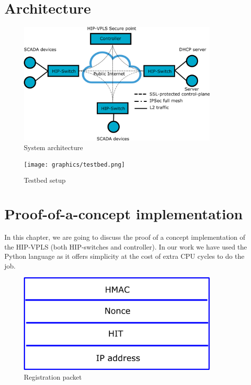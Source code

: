 \chapter{Architecture}

\begin{figure}[h!]
\centering
\includegraphics[width=0.9\textwidth]{graphics/arch.png}
\caption{System architecture}
\label{fig:architecture}
\end{figure}       


\begin{figure}[h!]
\centering
\texttt{[image: graphics/testbed.png]}
\caption{Testbed setup}
\label{fig:testbed}
\end{figure}    
    
\chapter{Proof-of-a-concept implementation}
In this chapter, we are going to discuss the proof of a concept
implementation of the HIP-VPLS (both HIP-switches and controller). 
In our work we have used the Python language as it offers simplicity
at the cost of extra CPU cycles to do the job.


\begin{figure}[h!]
\centering
\includegraphics[width=0.9\textwidth]{graphics/reg_packet.png}
\caption{Registration packet}
\label{fig:reg_packet}
\end{figure}

